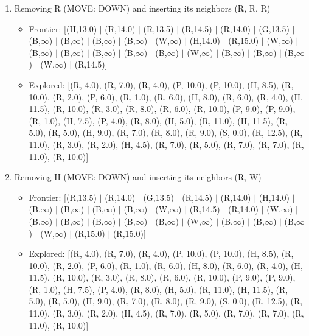 \documentclass[12pt]{article}
\begin{document}
\begin{enumerate}
\item Removing R (MOVE: DOWN) and inserting its neighbors (R, R, R)
\begin{itemize}
\item Frontier: [(H,13.0) \(|\) (R,14.0) \(|\) (R,13.5) \(|\) (R,14.5) \(|\) (R,14.0) \(|\) (G,13.5) \(|\) (B,\(\infty\)) \(|\) (B,\(\infty\)) \(|\) (B,\(\infty\)) \(|\) (B,\(\infty\)) \(|\) (W,\(\infty\)) \(|\) (H,14.0) \(|\) (R,15.0) \(|\) (W,\(\infty\)) \(|\) (B,\(\infty\)) \(|\) (B,\(\infty\)) \(|\) (B,\(\infty\)) \(|\) (B,\(\infty\)) \(|\) (B,\(\infty\)) \(|\) (W,\(\infty\)) \(|\) (B,\(\infty\)) \(|\) (B,\(\infty\)) \(|\) (B,\(\infty\)) \(|\) (W,\(\infty\)) \(|\) (R,14.5)]
\item Explored: [(R, 4.0), (R, 7.0), (R, 4.0), (P, 10.0), (P, 10.0), (H, 8.5), (R, 10.0), (R, 2.0), (P, 6.0), (R, 1.0), (R, 6.0), (H, 8.0), (R, 6.0), (R, 4.0), (H, 11.5), (R, 10.0), (R, 3.0), (R, 8.0), (R, 6.0), (R, 10.0), (P, 9.0), (P, 9.0), (R, 1.0), (H, 7.5), (P, 4.0), (R, 8.0), (H, 5.0), (R, 11.0), (H, 11.5), (R, 5.0), (R, 5.0), (H, 9.0), (R, 7.0), (R, 8.0), (R, 9.0), (S, 0.0), (R, 12.5), (R, 11.0), (R, 3.0), (R, 2.0), (H, 4.5), (R, 7.0), (R, 5.0), (R, 7.0), (R, 7.0), (R, 11.0), (R, 10.0)]
\end{itemize}

\item Removing H (MOVE: DOWN) and inserting its neighbors (R, W)
\begin{itemize}
\item Frontier: [(R,13.5) \(|\) (R,14.0) \(|\) (G,13.5) \(|\) (R,14.5) \(|\) (R,14.0) \(|\) (H,14.0) \(|\) (B,\(\infty\)) \(|\) (B,\(\infty\)) \(|\) (B,\(\infty\)) \(|\) (B,\(\infty\)) \(|\) (W,\(\infty\)) \(|\) (R,14.5) \(|\) (R,14.0) \(|\) (W,\(\infty\)) \(|\) (B,\(\infty\)) \(|\) (B,\(\infty\)) \(|\) (B,\(\infty\)) \(|\) (B,\(\infty\)) \(|\) (B,\(\infty\)) \(|\) (W,\(\infty\)) \(|\) (B,\(\infty\)) \(|\) (B,\(\infty\)) \(|\) (B,\(\infty\)) \(|\) (W,\(\infty\)) \(|\) (R,15.0) \(|\) (R,15.0)]
\item Explored: [(R, 4.0), (R, 7.0), (R, 4.0), (P, 10.0), (P, 10.0), (H, 8.5), (R, 10.0), (R, 2.0), (P, 6.0), (R, 1.0), (R, 6.0), (H, 8.0), (R, 6.0), (R, 4.0), (H, 11.5), (R, 10.0), (R, 3.0), (R, 8.0), (R, 6.0), (R, 10.0), (P, 9.0), (P, 9.0), (R, 1.0), (H, 7.5), (P, 4.0), (R, 8.0), (H, 5.0), (R, 11.0), (H, 11.5), (R, 5.0), (R, 5.0), (H, 9.0), (R, 7.0), (R, 8.0), (R, 9.0), (S, 0.0), (R, 12.5), (R, 11.0), (R, 3.0), (R, 2.0), (H, 4.5), (R, 7.0), (R, 5.0), (R, 7.0), (R, 7.0), (R, 11.0), (R, 10.0)]
\end{itemize}


\end{enumerate}
\end{document}
